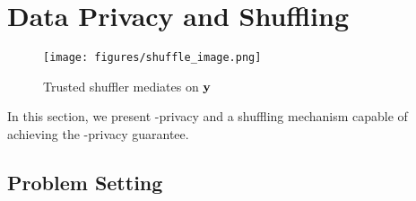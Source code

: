 \section{Data Privacy and Shuffling}\vspace{-0.2cm}

\begin{wrapfigure}{r}{0.44\textwidth}
	\vspace{-3em} 
    \texttt{[image: figures/shuffle\_image.png]} 
    \caption{\small{Trusted shuffler mediates on $\mathbf{y}$}} 
    \label{fig:problemsetting}
    \vspace{-3em} 
\end{wrapfigure}

In this section, we present \name-privacy and a shuffling mechanism capable of achieving the \name-privacy guarantee. 
\vspace{-0.3cm}
\subsection{Problem Setting} \vspace{-0.1cm}

